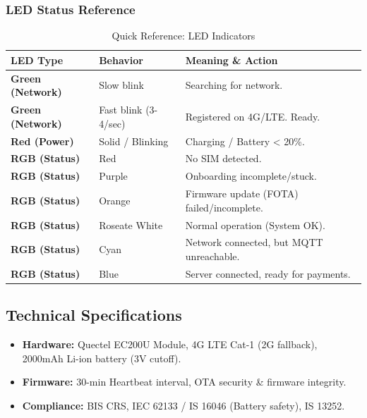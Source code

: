 \documentclass[11pt,a4paper]{article}
\begin{document}
\subsubsection{LED Status Reference}
\begin{table}[H]
    \centering
    \begin{tabular}{|l|l|p{8cm}|}
        \hline
        \textbf{LED Type} & \textbf{Behavior} & \textbf{Meaning \& Action} \\ \hline
        \textbf{Green (Network)} & Slow blink & Searching for network. \\ \hline
        \textbf{Green (Network)} & Fast blink (3-4/sec) & Registered on 4G/LTE. Ready. \\ \hline
        \textbf{Red (Power)} & Solid / Blinking & Charging / Battery < 20\%. \\ \hline
        \textbf{RGB (Status)} & Red & No SIM detected. \\ \hline
        \textbf{RGB (Status)} & Purple & Onboarding incomplete/stuck. \\ \hline
        \textbf{RGB (Status)} & Orange & Firmware update (FOTA) failed/incomplete. \\ \hline
        \textbf{RGB (Status)} & Roseate White & Normal operation (System OK). \\ \hline
        \textbf{RGB (Status)} & Cyan & Network connected, but MQTT unreachable. \\ \hline
        \textbf{RGB (Status)} & Blue & Server connected, ready for payments. \\ \hline
    \end{tabular}
    \caption{Quick Reference: LED Indicators}
\end{table}

\subsection{Technical Specifications}
\begin{itemize}
    \item \textbf{Hardware:} Quectel EC200U Module, 4G LTE Cat-1 (2G fallback), 2000mAh Li-ion battery (3V cutoff).
    \item \textbf{Firmware:} 30-min Heartbeat interval, OTA security \& firmware integrity.
    \item \textbf{Compliance:} BIS CRS, IEC 62133 / IS 16046 (Battery safety), IS 13252.
\end{itemize}
\end{document}
